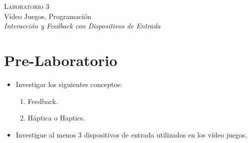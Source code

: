 \begin{center}
\textsc{\Large Laboratorio 3}~\\
{\large Vídeo Juegos, Programación}~\\
\emph{Interacción y \emph{Feedback} con Dispositivos de Entrada}
\end{center}

\section{Pre-Laboratorio}
\begin{itemize}
\item Investigar los siguientes conceptos:
\begin{enumerate}
  \item Feedback.
  \item Háptica o Haptics.
\end{enumerate}
\item Investigue al menos 3 dispositivos de entrada utilizados en los vídeo juegos.
\end{itemize}

